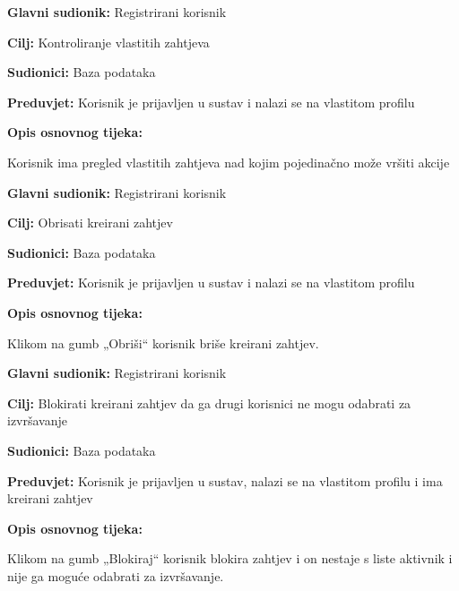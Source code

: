 \noindent {}
\begin{packed_item}
	\item \textbf{Glavni sudionik: }Registrirani korisnik
	\item  \textbf{Cilj:} Kontroliranje vlastitih zahtjeva
	\item  \textbf{Sudionici:} Baza podataka
	\item  \textbf{Preduvjet:} Korisnik je prijavljen u sustav i nalazi se na vlastitom profilu
	\item  \textbf{Opis osnovnog tijeka:}
	\item[] \begin{packed_enum}
		\item 	Korisnik ima pregled  vlastitih zahtjeva nad kojim pojedinačno može vršiti akcije 
	\end{packed_enum}
\end{packed_item}

\noindent {}
\begin{packed_item}
	\item \textbf{Glavni sudionik: }Registrirani korisnik
	\item  \textbf{Cilj:} Obrisati kreirani zahtjev
	\item  \textbf{Sudionici:} Baza podataka
	\item  \textbf{Preduvjet:} Korisnik je prijavljen u sustav i nalazi se na vlastitom profilu
	\item  \textbf{Opis osnovnog tijeka:}
	\item[] \begin{packed_enum}
		\item 	Klikom na gumb „Obriši“ korisnik briše kreirani zahtjev. 
	\end{packed_enum}
\end{packed_item}

\noindent {}
\begin{packed_item}
	\item \textbf{Glavni sudionik: }Registrirani korisnik
	\item  \textbf{Cilj:} Blokirati kreirani zahtjev da ga drugi korisnici ne mogu odabrati za izvršavanje
	\item  \textbf{Sudionici:} Baza podataka
	\item  \textbf{Preduvjet:} Korisnik je prijavljen u sustav, nalazi se na vlastitom profilu i ima kreirani zahtjev
	\item  \textbf{Opis osnovnog tijeka:}
	\item[] \begin{packed_enum}
		\item 	Klikom na gumb „Blokiraj“ korisnik blokira zahtjev i on nestaje s liste aktivnik i nije ga moguće odabrati za izvršavanje. 
	\end{packed_enum}
\end{packed_item}

